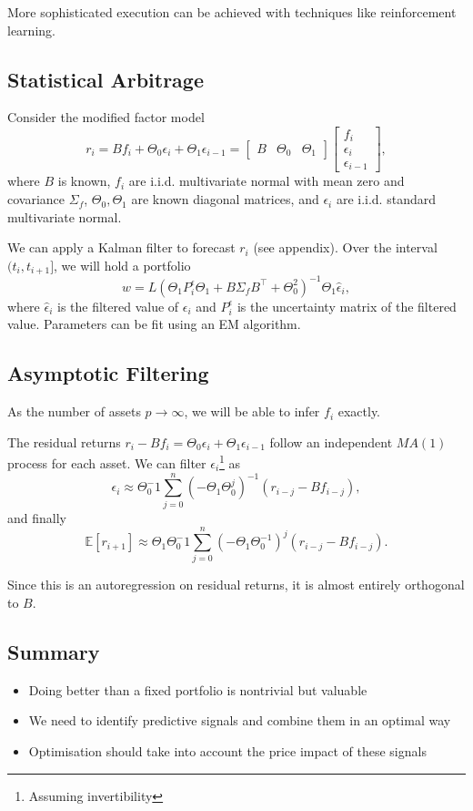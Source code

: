 \documentclass{article}
\begin{document}
More sophisticated execution can be achieved with techniques like reinforcement learning.

\subsection{Statistical Arbitrage}
Consider the modified factor model
$$r_i = Bf_i + \Theta_0\epsilon_i + \Theta_1\epsilon_{i-1} = \left[\begin{matrix}B & \Theta_0 & \Theta_1\end{matrix}\right]\left[\begin{matrix}f_i \\ \epsilon_i \\ \epsilon_{i-1}\end{matrix}\right],$$
where $B$ is known, $f_i$ are i.i.d. multivariate normal with mean zero and covariance $\Sigma_f$, $\Theta_0,\Theta_1$ are known diagonal matrices, and $\epsilon_i$ are i.i.d. standard multivariate normal.

We can apply a Kalman filter to forecast $r_i$ (see appendix). Over the interval $(t_i,t_{i+1}]$, we will hold a portfolio
$$w = L(\Theta_1 P^\epsilon_i \Theta_1 + B\Sigma_f B^\top + \Theta_0^2)^{-1} \Theta_1\hat{\epsilon}_i,$$
where $\hat{\epsilon}_i$ is the filtered value of $\epsilon_i$ and $P^\epsilon_i$ is the uncertainty matrix of the filtered value. Parameters can be fit using an EM algorithm.

\subsection{Asymptotic Filtering}
As the number of assets $p\to\infty$, we will be able to infer $f_i$ exactly.

The residual returns $r_i-Bf_i = \Theta_0\epsilon_i + \Theta_1 \epsilon_{i-1}$ follow an independent $MA(1)$ process for each asset. We can filter $\epsilon_i$\footnote{Assuming invertibility} as
$$\epsilon_i \approx \Theta_0^-1 \sum_{j=0}^n \left(-\Theta_1\Theta_0^j\right)^{-1}(r_{i-j}-Bf_{i-j}),$$
and finally
$$\mathbb{E}[r_{i+1}] \approx \Theta_1\Theta_0^-1 \sum_{j=0}^n \left(-\Theta_1\Theta_0^{-1}\right)^j(r_{i-j}-Bf_{i-j}).$$

Since this is an autoregression on residual returns, it is almost entirely orthogonal to $B$.

\subsection{Summary}
\begin{itemize}
	\item Doing better than a fixed portfolio is nontrivial but valuable
	\item We need to identify predictive signals and combine them in an optimal way
	\item Optimisation should take into account the price impact of these signals
\end{itemize}
\end{document}
